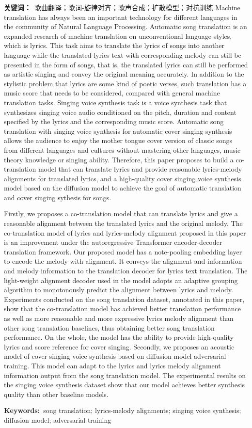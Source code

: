 \noindent\textbf{关键词：}~歌曲翻译；歌词-旋律对齐；歌声合成；扩散模型；对抗训练
Machine translation has always been an important technology for different languages in the community of Natural Language Processing. Automatic song translation is an expanded research of machine translation on unconventional language styles, which is lyrics. This task aims to translate the lyrics of songs into another language while the translated lyrics text with corresponding melody can still be presented in the form of songs, that is, the translated lyrics can still be performed as artistic singing and convey the original meaning accurately. In addition to the stylistic problem that lyrics are some kind of poetic verses, such translation has a music score  that needs to be considered, compared with general machine translation tasks. Singing voice synthesis task is a voice synthesis task that synthesizes singing voice audio conditioned on the pitch, duration and content specified by the lyrics and the corresponding music score. Automatic song translation with singing voice synthesis for automatic cover singing synthesis allows the audience to enjoy the mother tongue cover version of classic songs from different languages and cultures without mastering other languages, music theory knowledge or singing ability.
Therefore, this paper proposes to build a co-translation model that can translate lyrics and provide reasonable lyrics-melody alignments for translated lyrics, and a high-quality cover singing voice synthesis model based on the diffusion model to achieve the goal of automatic translation and cover singing sythesis for songs.

Firstly, we proposes a co-translation model that can translate lyrics and give a reasonable alignment between the translated lyrics and the original melody. The co-translation model of lyrics and lyrics-melody alignment proposed in this paper is an improvement under the autoregressive Transformer encoder-decoder translation framework. Our proposed model has a note-pooling embedding layer to encode the melody with alignment. It conveys the alignment and information and melody information to the translation decoder for lyrics text translation. The light-weight alignment decoder used in the model adopts an adaptive grouping algorithm to monotonously predict the alignment between lyrics and melody. Experiments conducted on the song translation dataset, annotated in this paper, show that the co-translation model has achieved better translation performance as well as more reasonable and more expressive lyrics melody alignment than other song translation baselines, thus obtaining better song translation performance. On the whole, the model has the ability to provide high-quality lyrics and score reference for cover singing.
Secondly, we proposes an acoustic model of cover singing voice synthesis based on diffusion model adversarial training. This model can adapt to the lyrics and lyrics melody alignment information output from the song translation model. The experimental results on the singing voice synthesis dataset show that our model achieves better synthesis quality than other baseline models.

\noindent\textbf{Keywords:}~song translation; lyrics-melody alignments; singing voice synthesis; diffusion model; adversarial training
